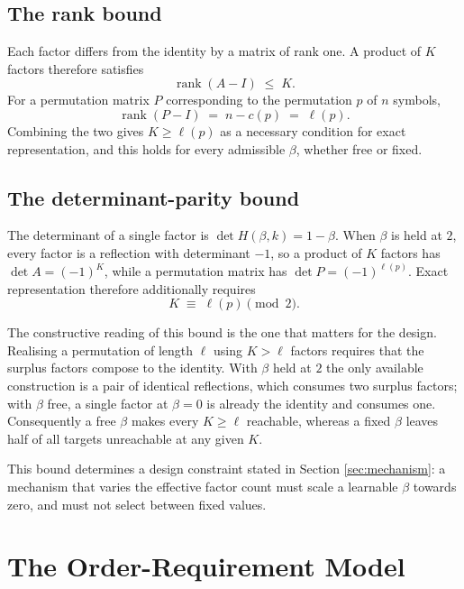\subsection{The rank bound}

Each factor differs from the identity by a matrix of rank one. A product of $K$
factors therefore satisfies
\begin{equation}
\operatorname{rank}(A - I) \;\le\; K .
\end{equation}
For a permutation matrix $P$ corresponding to the permutation $p$ of $n$ symbols,
\begin{equation}
\operatorname{rank}(P - I) \;=\; n - c(p) \;=\; \ell(p).
\end{equation}
Combining the two gives $K \ge \ell(p)$ as a necessary condition for exact
representation, and this holds for every admissible $\beta$, whether free or
fixed.

\subsection{The determinant-parity bound}

The determinant of a single factor is $\det H(\beta,k) = 1 - \beta$. When
$\beta$ is held at $2$, every factor is a reflection with determinant $-1$, so a
product of $K$ factors has $\det A = (-1)^K$, while a permutation matrix has
$\det P = (-1)^{\ell(p)}$. Exact representation therefore additionally requires
\begin{equation}
K \;\equiv\; \ell(p) \pmod 2 .
\end{equation}

The constructive reading of this bound is the one that matters for the design.
Realising a permutation of length $\ell$ using $K > \ell$ factors requires that
the surplus factors compose to the identity. With $\beta$ held at $2$ the only
available construction is a pair of identical reflections, which consumes two
surplus factors; with $\beta$ free, a single factor at $\beta = 0$ is already the
identity and consumes one. Consequently a free $\beta$ makes every $K \ge \ell$
reachable, whereas a fixed $\beta$ leaves half of all targets unreachable at any
given $K$.

This bound determines a design constraint stated in Section \ref{sec:mechanism}:
a mechanism that varies the effective factor count must scale a learnable
$\beta$ towards zero, and must not select between fixed values.

\section{The Order-Requirement Model}
\label{sec:demand}

